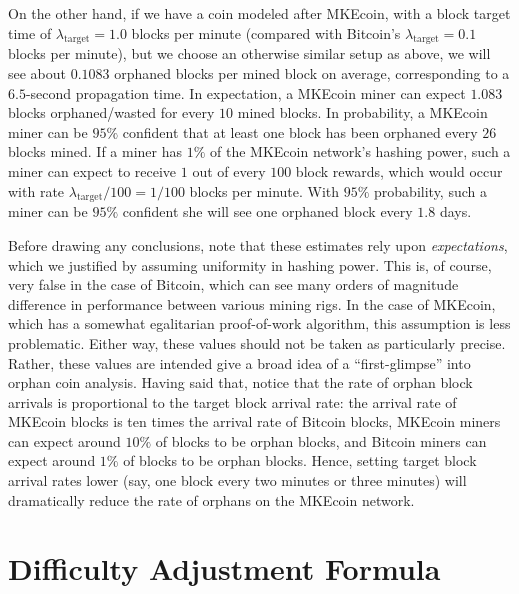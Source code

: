 \documentclass[12pt,english]{mrl}
\theoremstyle{definition}
\numberwithin{equation}{section}
\numberwithin{figure}{section}
\numberwithin{equation}{section}
\numberwithin{equation}{section}
\numberwithin{figure}{section}
\begin{document}
On the other hand, if we have a coin modeled after MKEcoin, with a block target time of $\lambda_{\text{target}}=1.0$ blocks per minute (compared with Bitcoin's $\lambda_{\text{target}} = 0.1$ blocks per minute), but we choose an otherwise similar setup as above, we will see about $0.1083$ orphaned blocks per mined block on average, corresponding to a $6.5$-second propagation time. In expectation, a MKEcoin miner can expect $1.083$ blocks orphaned/wasted for every $10$ mined blocks. In probability, a MKEcoin miner can be $95\%$ confident that at least one block has been orphaned every $26$ blocks mined. If a miner has $1\%$ of the MKEcoin network's hashing power, such a miner can expect to receive $1$ out of every $100$ block rewards, which would occur with rate $\lambda_{\text{target}}/100 = 1/100$ blocks per minute. With $95\%$ probability, such a miner can be $95\%$ confident she will see one orphaned block every $1.8$ days.

Before drawing any conclusions, note that these estimates rely upon \textit{expectations}, which we justified by assuming uniformity in hashing power. This is, of course, very false in the case of Bitcoin, which can see many orders of magnitude difference in performance between various mining rigs. In the case of MKEcoin, which has a somewhat egalitarian proof-of-work algorithm, this assumption is less problematic. Either way, these values should not be taken as particularly precise. Rather, these values are intended give a broad idea of a ``first-glimpse'' into orphan coin analysis. Having said that, notice that the rate of orphan block arrivals is proportional to the target block arrival rate: the arrival rate of MKEcoin blocks is ten times the arrival rate of Bitcoin blocks, MKEcoin miners can expect around $10\%$ of blocks to be orphan blocks, and Bitcoin miners can expect around $1\%$ of blocks to be orphan blocks. Hence, setting target block arrival rates lower (say, one block every two minutes or three minutes) will dramatically reduce the rate of orphans on the MKEcoin network.




\section{Difficulty Adjustment Formula}\label{myCode}
\end{document}
